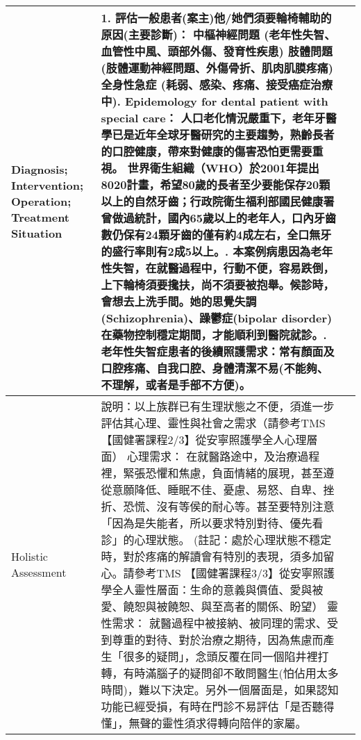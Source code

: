 \documentclass[12pt, a4paper]{article}
\begin{document}
\begin{xltabular}{1.0\linewidth}[c]{|p{2.3cm}|p{12.4cm}|l|}
Diagnosis; Intervention;\newline 
   Operation; Treatment Situation &
  1. 評估一般患者(案主)他/她們須要輪椅輔助的原因(主要診斷)： 中樞神經問題 (老年性失智、血管性中風、頭部外傷、發育性疾患) 肢體問題 (肢體運動神經問題、外傷骨折、肌肉肌膜疼痛) 全身性急症 (耗弱、感染、疼痛、接受癌症治療中). Epidemology for dental patient with special care：\newline
  人口老化情況嚴重下，老年牙醫學已是近年全球牙醫研究的主要趨勢，熟齡長者的口腔健康，帶來對健康的傷害恐怕更需要重視。\newline
    世界衛生組織（WHO）於2001年提出8020計畫，希望80歲的長者至少要能保存20顆以上的自然牙齒；行政院衛生福利部國民健康署曾做過統計，國內65歲以上的老年人，口內牙齒數仍保有24顆牙齒的僅有約4成左右，全口無牙的盛行率則有2成5以上。. 本案例病患因為老年性失智，在就醫過程中，行動不便，容易跌倒，上下輪椅須要攙扶，尚不須要被抱舉。候診時，會想去上洗手間。她的思覺失調(Schizophrenia)、躁鬱症(bipolar disorder)在藥物控制穩定期間，才能順利到醫院就診。. 老年性失智症患者的後續照護需求：常有顏面及口腔疼痛、自我口腔、身體清潔不易(不能夠、不理解，或者是手部不方便)。 &
   \\ \hline
Holistic \newline
Assessment &
  {\color[HTML]{C0C0C0}說明：以上族群已有生理狀態之不便，須進一步評估其心理、靈性與社會之需求（請參考TMS 【國健署課程2/3】從安寧照護學全人心理層面）}\newline 
  心理需求：\newline
   在就醫路途中，及治療過程裡，緊張恐懼和焦慮，負面情緒的展現，甚至遵從意願降低、睡眠不佳、憂慮、易怒、自卑、挫折、恐慌、沒有等侯的耐心等。甚至要特別注意「因為是失能者，所以要求特別對待、優先看診」的心理狀態。\newline 
  {\color[HTML]{C0C0C0} (註記：處於心理狀態不穩定時，對於疼痛的解讀會有特別的表現，須多加留心。請參考TMS 【國健署課程3/3】從安寧照護學全人靈性層面：生命的意義與價值、愛與被愛、饒恕與被饒恕、與至高者的關係、盼望）}\newline
  靈性需求：\newline
  就醫過程中被接納、被同理的需求、受到尊重的對待、對於治療之期待，因為焦慮而產生「很多的疑問」，念頭反覆在同一個陷井裡打轉，有時滿腦子的疑問卻不敢問醫生(怕佔用太多時間)，難以下決定。另外一個層面是，如果認知功能已經受損，有時在門診不易評估「是否聽得懂」，無聲的靈性須求得轉向陪伴的家屬。\newline 

\end{xltabular}
\end{document}
